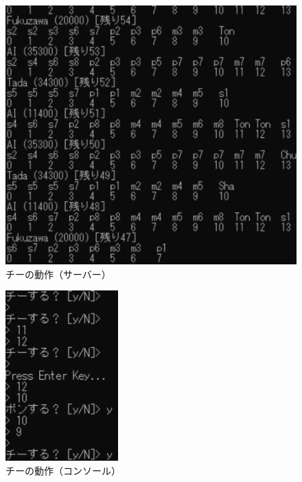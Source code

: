 \documentclass[a4j,titlepage]{jsarticle}
\begin{document}
\begin{figure}[htbp]
  \centering
  \includegraphics[width = 0.8\linewidth]{images/chi_server.png}
  \caption{チーの動作（サーバー）}
  \label{fig:chi_server}
\end{figure}

\begin{figure}[htbp]
  \centering
  \includegraphics[width = 0.4\linewidth]{images/chi_console.png}
  \caption{チーの動作（コンソール）}
  \label{fig:chi_console}
\end{figure}
\end{document}
